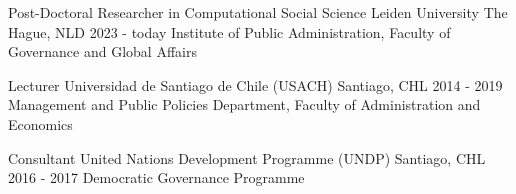 






\begin{cventries}
\cventry
{Post-Doctoral Researcher in Computational Social Science} 
{Leiden University} 
{The Hague, NLD} 
{2023 - today}
{Institute of Public Administration, Faculty of Governance and Global Affairs} \vspace{1.5mm}


\cventry
{Lecturer} 
{Universidad de Santiago de Chile (USACH)} 
{Santiago, CHL} 
{2014 - 2019}
{Management and Public Policies Department, Faculty of Administration and Economics} \vspace{1.5mm}


\cventry
{Consultant} 
{United Nations Development Programme (UNDP)} 
{Santiago, CHL} 
{2016 - 2017}
{Democratic Governance Programme} %

\end{cventries}
\pagebreak